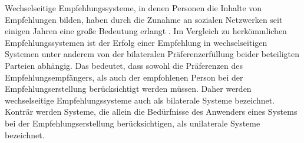 Wechselseitige Empfehlungssysteme, in denen Personen die Inhalte von Empfehlungen bilden, haben durch die Zunahme an sozialen Netzwerken seit einigen Jahren eine große Bedeutung erlangt \cite[S. 2429]{palomares:inproceedings}.
Im Vergleich zu herkömmlichen Empfehlungssystemen ist der Erfolg einer Empfehlung in wechselseitigen Systemen unter anderem von der bilateralen Präferenzerfüllung beider beteiligten Parteien abhängig.
Das bedeutet, dass sowohl die Präferenzen des Empfehlungsempfängers, als auch der empfohlenen Person bei der Empfehlungserstellung berücksichtigt werden müssen.
Daher werden wechselseitige Empfehlungssysteme auch als bilaterale Systeme bezeichnet.
Konträr werden Systeme, die allein die Bedürfnisse des Anwenders eines Systems bei der Empfehlungserstellung berücksichtigen, als unilaterale Systeme bezeichnet.

